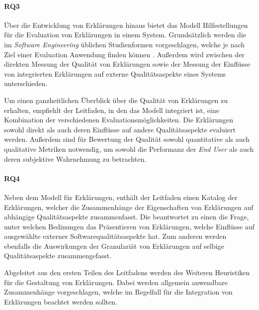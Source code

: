 \paragraph{RQ3} Über die Entwicklung von Erklärungen hinaus bietet das Modell Hilfestellungen für die Evaluation von Erklärungen in einem System. Grundsätzlich werden die im \textit{Software Engineering} üblichen Studienformen vorgeschlagen, welche je nach Ziel einer Evaluation Anwendung finden können \cite[vgl.][]{wohlin2012experimentation}. Außerdem wird zwischen der direkten Messung der Qualität von Erklärungen sowie der Messung der Einflüsse von integrierten Erklärungen auf externe Qualitätsaspekte eines Systems unterschieden.

Um einen ganzheitlichen Überblick über die Qualität von Erklärungen zu erhalten, empfiehlt der Leitfaden, in den das Modell integriert ist, eine Kombination der verschiedenen Evaluationsmöglichkeiten. Die Erklärungen sowohl direkt als auch deren Einflüsse auf andere Qualitätsaspekte evaluiert werden. Außerdem sind für Bewertung der Qualität sowohl quantitative als auch qualitative Metriken notwendig, um sowohl die Performanz der \textit{End User} als auch deren subjektive Wahrnehmung zu betrachten.

\paragraph{RQ4} Neben dem Modell für Erklärungen, enthält der Leitfaden einen Katalog der Erklärungen, welcher die Zusammenhänge der Eigenschaften von Erklärungen auf abhängige Qualitätsaspekte zusammenfasst. Die beantwortet zu einen die Frage, unter welchen Bedinungen das Präsentieren von Erklärungen, welche Einflüsse auf ausgewählte externer Softwarequalitätsaspekte hat. Zum anderen werden ebenfalls die Auswirkungen der Granulariät von Erklärungen auf selbige Qualitätsaspekte zusammengefasst.

\bigskip

Abgeleitet aus den ersten Teilen des Leitfadens werden des Weiteren Heuristiken für die Gestaltung von Erklärungen. Dabei werden allgemein anwendbare Zusammenhänge vorgeschlagen, welche im Regelfall für die Integration von Erklärungen beachtet werden sollten.

\bigskip

